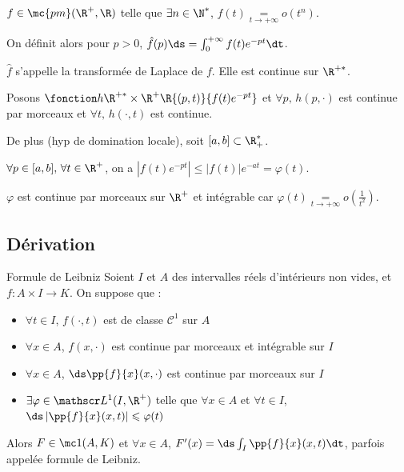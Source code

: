 \begin{exemple}
    $f \in \mc{pm}(\R^+, \R)$ telle que $\exists n \in \N^*$, $f(t) \underset{t \to + \infty}{=} o(t^n)$.

    On définit alors pour $p > 0$, $\hat f(p) \ds = \int_0^{+ \infty} f(t) e^{-pt} \dt$.

    $\hat f$ s'appelle la transformée de Laplace de $f$. Elle est continue sur $\R^{+*}$.

    Posons $\fonction h {\R^{+*} \times \R^+}\R{(p, t)}{f(t) e^{-pt}}$ et 
    $\forall p, \, h(p, \cdot)$ est continue par morceaux et $\forall t, \, h(\cdot, t)$ est continue. 

    De plus (hyp de domination locale), soit $[a, b] \subset \R^*_+$. 

    $\forall p \in [a, b], \, \forall t \in \R^+$, on a $|f(t) e^{-pt}| \leqslant |f(t)|e^{-at} = \varphi(t)$. 

    $\varphi$ est continue par morceaux sur $\R^+$ et intégrable car 
    $\varphi(t) \underset{t \to + \infty}{=} o\left( \frac 1 {t^2} \right)$.
\end{exemple}

\subsection{Dérivation }

\begin{theoreme}{Formule de Leibniz}{}
    Soient $I$ et $A$ des intervalles réels d'intérieurs non vides, et $f : A \times I \to K$. 
    On suppose que :
    \begin{itemize}
        \item $\forall t \in I$, $f(\cdot, t)$ est de classe $\mathscr C^1$ sur $A$
        \item $\forall x \in A$, $f(x, \cdot)$ est continue par morceaux et intégrable sur $I$
        \item $\forall x \in A$, $\ds \pp {f}{x} (x, \cdot)$ est continue par morceaux sur $I$
        \item $\exists \varphi \in \mathscr L^1(I, \R^+)$ telle que $\forall x \in A$ et $\forall t \in I$, $\ds \left|\pp{f}{x} (x, t) \right| \leqslant \varphi(t)$
    \end{itemize}

    Alors $F \in \mc 1 (A, K)$ et $\forall x \in A$, $F'(x) = \ds \int_I \pp{f}{x} (x, t) \dt$, parfois appelée 
    formule de Leibniz.
\end{theoreme}

